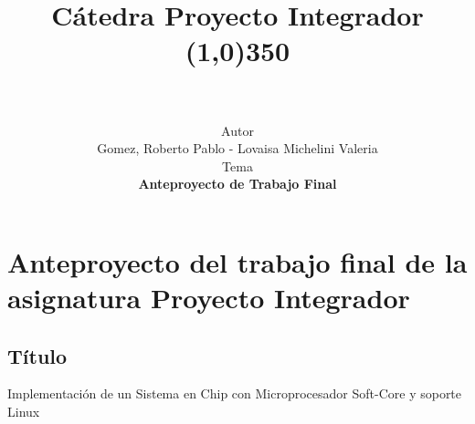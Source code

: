 \documentclass[a4paper,12pt]{article}
\begin{document}
\title{\vspace{2cm} \textbf{Cátedra Proyecto Integrador \\ \line(1,0){350}}\\
  \vspace{0.5cm}\\}
\author{\vspace{-0.25cm} Autor \vspace{0.25cm}\\ Gomez, Roberto Pablo - Lovaisa
Michelini Valeria \bigskip \bigskip \bigskip \\
  Tema \vspace{0.25cm} \\ \textbf{Anteproyecto de Trabajo Final}\\ 
}
\date{}

\maketitle{}
\newpage

\section{Anteproyecto del trabajo final de la asignatura Proyecto Integrador}

\subsection{Título}
Implementación de un Sistema en Chip con Microprocesador Soft-Core y soporte Linux
\end{document}
